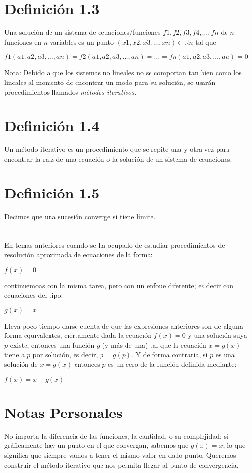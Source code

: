 \documentclass[12pt]{article}
\begin{document}
    \section*{Definición 1.3}
    Una solución de un sistema de ecuaciones/funciones $f1, f2, f3, f4, \dots, fn$ de $n$ funciones en $n$ variables es un punto $(x1, x2, x3, \dots, xn) \in \mathbb{R}n$ tal que 
    \begin{center}
        $f1(a1, a2, a3, \dots, an) = f2(a1, a2, a3, \dots, an) = \dots = fn(a1, a2, a3, \dots, an) = 0  $
    \end{center}
    \small{Nota: Debido a que los sistemas no lineales no se comportan tan bien como los lineales al momento de encontrar un modo para su solución, se usarán procedimientos llamados \it{métodos iterativos}.}
    \section*{Definición 1.4}
    Un método iterativo es un procedimiento que se repite una y otra vez para encontrar la raíz de una ecuación o la solución de un sistema de ecuaciones.
    \section*{Definición 1.5}
    Decimos que una sucesión converge si tiene límite.
    \section*{}
    En temas anteriores cuando se ha ocupado de estudiar procedimientos de resolución aproximada de ecuaciones de la forma:
    \begin{center}
        $f(x) = 0$
    \end{center}
    continuemoas con la misma tarea, pero con un enfoue diferente; es decir con ecuaciones del tipo:
    \begin{center}
        $g(x) = x$
    \end{center}
    Lleva poco tiempo darse cuenta de que las expresiones anteriores son de alguna forma equivalentes, ciertamente dada la ecuación $f(x) = 0$ y una solución suya $p$ existe, entonces una función $g$ (y más de una) tal que la ecuación $x=g(x)$ tiene a $p$ por solución, es decir, $p=g(p)$. Y de forma contraria, si $p$ es una solución de $x=g(x)$ entonces $p$ es un cero de la función definida mediante:
    \begin{center}
        $f(x) = x - g(x)$
    \end{center}
    \section*{Notas Personales}
    No importa la diferencia de las funciones, la cantidad, o su complejidad; si gráficamente hay un punto en el que convergan, sabemos que $g(x)=x$, lo que significa que siempre vamos a tener el mismo valor en dado punto.
    Queremos construir el método iterativo que nos permita llegar al punto de convergencia.
\end{document}
